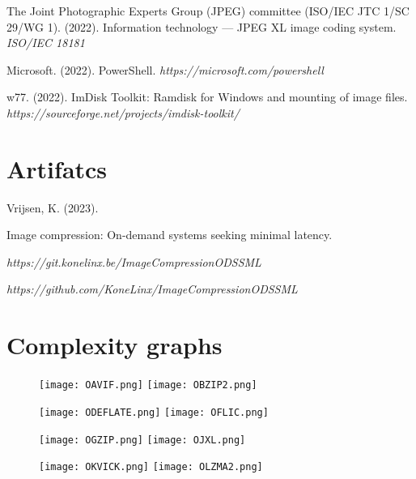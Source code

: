 \documentclass[11pt,a4paper]{report}
\begin{document}
\begin{thebibliography}{9}
The Joint Photographic Experts Group (JPEG) committee (ISO/IEC JTC 1/SC 29/WG 1). (2022). Information technology — JPEG XL image coding system. \textit{ISO/IEC 18181}

Microsoft. (2022). PowerShell. \textit{https://microsoft.com/powershell}

w77. (2022). ImDisk Toolkit: Ramdisk for Windows and mounting of image files. \textit{https://sourceforge.net/projects/imdisk-toolkit/}

\end{thebibliography}


\newpage
{}

\appendix

\chapter{Artifatcs\label{app:repo}}

Vrijsen, K. (2023).

Image compression: On-demand systems seeking minimal latency.

\textit{https://git.konelinx.be/ImageCompressionODSSML} 

\textit{https://github.com/KoneLinx/ImageCompressionODSSML}

\chapter{Complexity graphs\label{app:ographs}}

\begin{figure}[ht!]
\centering
\texttt{[image: OAVIF.png]}
\texttt{[image: OBZIP2.png]}
\end{figure}

\begin{figure}[ht!]
\centering
\texttt{[image: ODEFLATE.png]}
\texttt{[image: OFLIC.png]}
\end{figure}

\begin{figure}[ht!]
\centering
\texttt{[image: OGZIP.png]}
\texttt{[image: OJXL.png]}
\end{figure}

\begin{figure}[ht!]
\centering
\texttt{[image: OKVICK.png]}
\texttt{[image: OLZMA2.png]}
\end{figure}
\end{document}
